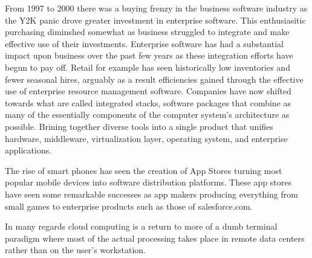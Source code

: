 From 1997 to 2000 there was a buying frenzy in the business software industry as the Y2K panic drove greater investment in enterprise software.\autocite[]{AftermathOfIntegratedStack}
This enthusiasitic purchasing diminshed somewhat as business struggled to integrate and make effective use of their investments.\autocite[]{AftermathOfIntegratedStack}
Enterprise software has had a substantial impact upon business over the past few years as these integration efforts have begun to pay off. Retail for example has seen historically low inventories and fewer seasonal hires, arguably as a result efficiencies gained through the effective use of enterprise resource management software. \autocite[]{AftermathOfIntegratedStack}
Companies have now shifted towards what are called integrated stacks, software packages that combine as many of the essentially components of the computer system's architecture as possible.
Brining together diverse tools into a single product that unifies hardware, middleware, virtualization layer, operating system, and enterprise applications.\autocite[]{AftermathOfIntegratedStack}

The rise of smart phones has seen the creation of App Stores turning most popular mobile devices into software distribution platforms.\autocite[]{TheAppEconomy}
These app stores have seen some remarkable successes as app makers producing everything from small games to enterprise products such as those of salesforce.com.\autocite[45]{TheAppEconomy}

In many regards cloud computing is a return to more of a dumb terminal paradigm where most of the actual processing takes place in remote data centers rather than on the user's workstation.\autocite[]{LargeParadigmShiftCloudComputing}
